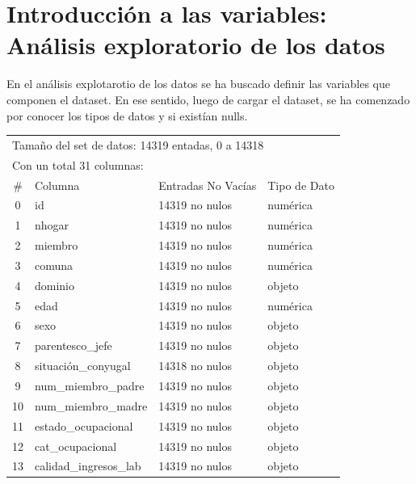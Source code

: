 \documentclass[a4paper]{article}
\begin{document}
\newpage

\section{Introducción a las variables: Análisis exploratorio de los datos}
 
    En el análisis explotarotio de los datos se ha buscado definir las variables que componen el dataset. En ese sentido, luego de cargar el dataset, se ha comenzado por conocer los tipos de datos y si existían nulls.
   
    \begin{table}[H]\begin{center}
    \begin{tabular}{clll}
    \multicolumn{4}{l}{Tamaño del set de datos: 14319 entadas, 0 a 14318} \\
    \multicolumn{4}{l}{Con un total 31 columnas:}  \\
    \toprule
    \#  & Columna                   & Entradas No Vacías & Tipo de Dato \\ \midrule
    0  & id                            & 14319 no nulos & numérica \\
    1  & nhogar                        & 14319 no nulos & numérica \\
    2  & miembro                       & 14319 no nulos & numérica \\
    3  & comuna                        & 14319 no nulos & numérica \\
    4  & dominio                       & 14319 no nulos & objeto \\
    5  & edad                          & 14319 no nulos & numérica \\
    6  & sexo                          & 14319 no nulos & objeto \\
    7  & parentesco\_jefe              & 14319 no nulos & objeto \\
    8  & situación\_conyugal           & 14318 no nulos & objeto \\
    9  & num\_miembro\_padre           & 14319 no nulos & objeto \\
    10 & num\_miembro\_madre           & 14319 no nulos & objeto \\
    11 & estado\_ocupacional           & 14319 no nulos & objeto \\
    12 & cat\_ocupacional              & 14319 no nulos & objeto \\
    13 & calidad\_ingresos\_lab        & 14319 no nulos & objeto \\

\end{tabular}
\end{center}
\end{table}
\end{document}
